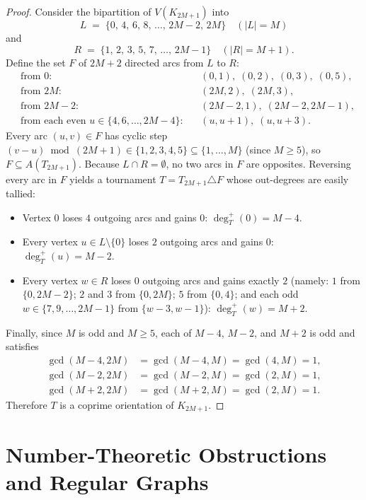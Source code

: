 \documentclass[11pt,a4paper]{article}
\theoremstyle{definition}
\theoremstyle{remark}
\newcommand{\outdeg}{\deg^{+}}
\begin{document}
\begin{proof}
Consider the bipartition of $V(K_{2M+1})$ into
\[
  L \;=\; \{0,\, 4,\, 6,\, 8,\, \dots,\, 2M - 2,\, 2M\} \quad (|L| = M)
\]
and
\[
  R \;=\; \{1,\, 2,\, 3,\, 5,\, 7,\, \dots,\, 2M - 1\} \quad (|R| = M + 1).
\]
Define the set $F$ of $2M + 2$ directed arcs from $L$ to $R$:
\begin{align*}
  &\text{from } 0: && (0, 1),\; (0, 2),\; (0, 3),\; (0, 5), \\
  &\text{from } 2M: && (2M, 2),\; (2M, 3), \\
  &\text{from } 2M - 2: && (2M - 2, 1),\; (2M - 2, 2M - 1), \\
  &\text{from each even } u \in \{4, 6, \dots, 2M - 4\}: && (u, u + 1),\; (u, u + 3).
\end{align*}
Every arc $(u, v) \in F$ has cyclic step $(v - u) \bmod (2M + 1) \in \{1, 2, 3, 4, 5\} \subseteq \{1, \dots, M\}$ (since $M \ge 5$), so $F \subseteq A(T_{2M+1})$. Because $L \cap R = \emptyset$, no two arcs in $F$ are opposites. Reversing every arc in $F$ yields a tournament $T = T_{2M+1} \triangle F$ whose out-degrees are easily tallied:
\begin{itemize}[leftmargin=2em,itemsep=1pt]
  \item Vertex $0$ loses $4$ outgoing arcs and gains $0$: $\outdeg_T(0) = M - 4$.
  \item Every vertex $u \in L \setminus \{0\}$ loses $2$ outgoing arcs and gains $0$: $\outdeg_T(u) = M - 2$.
  \item Every vertex $w \in R$ loses $0$ outgoing arcs and gains exactly $2$ (namely: $1$ from $\{0, 2M - 2\}$; $2$ and $3$ from $\{0, 2M\}$; $5$ from $\{0, 4\}$; and each odd $w \in \{7, 9, \dots, 2M - 1\}$ from $\{w - 3, w - 1\}$): $\outdeg_T(w) = M + 2$.
\end{itemize}
Finally, since $M$ is odd and $M \ge 5$, each of $M - 4$, $M - 2$, and $M + 2$ is odd and satisfies
\begin{align*}
  \gcd(M - 4, 2M) &= \gcd(M - 4, M) = \gcd(4, M) = 1,\\
  \gcd(M - 2, 2M) &= \gcd(M - 2, M) = \gcd(2, M) = 1,\\
  \gcd(M + 2, 2M) &= \gcd(M + 2, M) = \gcd(2, M) = 1.
\end{align*}
Therefore $T$ is a coprime orientation of $K_{2M+1}$.
\end{proof}

\section{Number-Theoretic Obstructions and Regular Graphs}
\end{document}
